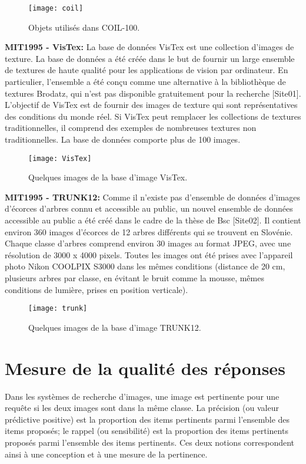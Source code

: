\begin{figure}[h]
	\centering
	\texttt{[image: coil]} 
	\caption{Objets utilisés dans COIL-100.}
\end{figure}

\textbf{MIT1995 - VisTex:}
La base de données VisTex est une collection d'images de texture. La base de données a été créée dans le but de fournir un large ensemble de textures de haute qualité pour les applications de vision par ordinateur. En particulier, l'ensemble a été conçu comme une alternative à la bibliothèque de textures Brodatz, qui n'est pas disponible gratuitement pour la recherche [Site01]. L'objectif de VisTex est de fournir des images de texture qui sont représentatives des conditions du monde réel. Si VisTex peut remplacer les collections de textures traditionnelles, il comprend des exemples de nombreuses textures non traditionnelles. La base de données comporte plus de 100 images.

\begin{figure}[h]
	\centering
	\texttt{[image: VisTex]} 
	\caption{Quelques images de la base d’image VisTex.}
\end{figure}

\textbf{MIT1995 - TRUNK12:}
Comme il n'existe pas d'ensemble de données d'images d'écorces d'arbres connu et accessible au public, un nouvel ensemble de données accessible au public a été créé dans le cadre de la thèse de Bsc [Site02]. Il contient environ 360 images d'écorces de 12 arbres différents qui se trouvent en Slovénie. Chaque classe d'arbres comprend environ 30 images au format JPEG, avec une résolution de 3000 x 4000 pixels. Toutes les images ont été prises avec l'appareil photo Nikon COOLPIX S3000 dans les mêmes conditions (distance de 20 cm, plusieurs arbres par classe, en évitant le bruit comme la mousse, mêmes conditions de lumière, prises en position verticale).

\begin{figure}[H]
	\centering
	\texttt{[image: trunk]} 
	\caption{Quelques images de la base d’image TRUNK12.}
\end{figure}

\section{Mesure de la qualité des réponses}
Dans les systèmes de recherche d’images, une image est pertinente pour
une requête si les deux images sont dans la même classe.
La précision (ou valeur prédictive positive) est la proportion des items pertinents parmi l'ensemble des items proposés; le rappel (ou sensibilité) est la proportion des items pertinents proposés parmi l'ensemble des items pertinents. Ces deux notions correspondent ainsi à une conception et à une mesure de la pertinence.\\

